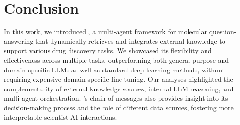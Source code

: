 
\vspace{-2ex}
\section{Conclusion}
\vspace{-1ex}
In this work, we introduced \proposed, a multi-agent framework for molecular question-answering that dynamically retrieves and integrates external knowledge to support various drug discovery tasks. 
We showcased its flexibility and effectiveness across multiple tasks, outperforming both general-purpose and domain-specific LLMs as well as standard deep learning methods, without requiring expensive domain-specific fine-tuning.
Our analyses highlighted the complementarity of external knowledge sources, internal LLM reasoning, and multi-agent orchestration. \proposed's chain of messages also provides insight into its decision-making process and the role of different data sources, fostering more interpretable scientist-AI interactions.


